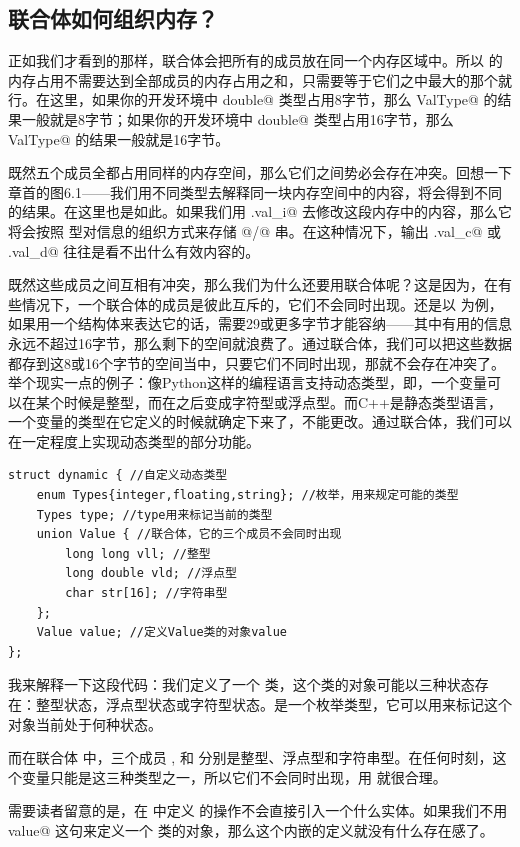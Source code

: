 \subsection*{联合体如何组织内存？}
正如我们才看到的那样，联合体会把所有的成员放在同一个内存区域中。所以 \lstinline@ValType@ 的内存占用不需要达到全部成员的内存占用之和，只需要等于它们之中最大的那个就行。在这里，如果你的开发环境中 \lstinline@long double@ 类型占用8字节，那么 \lstinline@sizeof ValType@ 的结果一般就是8字节；如果你的开发环境中 \lstinline@long double@ 类型占用16字节，那么 \lstinline@sizeof ValType@ 的结果一般就是16字节。\par
既然五个成员全都占用同样的内存空间，那么它们之间势必会存在冲突。回想一下章首的图6.1——我们用不同类型去解释同一块内存空间中的内容，将会得到不同的结果。在这里也是如此。如果我们用 \lstinline@a.val_i@ 去修改这段内存中的内容，那么它将会按照 \lstinline@int@ 型对信息的组织方式来存储 @/@ 串。在这种情况下，输出 \lstinline@a.val_c@ 或 \lstinline@a.val_d@ 往往是看不出什么有效内容的。\par
既然这些成员之间互相有冲突，那么我们为什么还要用联合体呢？这是因为，在有些情况下，一个联合体的成员是彼此互斥的，它们不会同时出现。还是以 \lstinline@ValType@ 为例，如果用一个结构体来表达它的话，需要29或更多字节才能容纳——其中有用的信息永远不超过16字节，那么剩下的空间就浪费了。通过联合体，我们可以把这些数据都存到这8或16个字节的空间当中，只要它们不同时出现，那就不会存在冲突了。
举个现实一点的例子：像Python这样的编程语言支持动态类型，即，一个变量可以在某个时候是整型，而在之后变成字符型或浮点型。而C++是静态类型语言，一个变量的类型在它定义的时候就确定下来了，不能更改。通过联合体，我们可以在一定程度上实现动态类型的部分功能。\par
\begin{lstlisting}
struct dynamic { //自定义动态类型
    enum Types{integer,floating,string}; //枚举，用来规定可能的类型
    Types type; //type用来标记当前的类型
    union Value { //联合体，它的三个成员不会同时出现
        long long vll; //整型
        long double vld; //浮点型
        char str[16]; //字符串型
    };
    Value value; //定义Value类的对象value
};
\end{lstlisting}\par
我来解释一下这段代码：我们定义了一个 \lstinline@dynamic@ 类，这个类的对象可能以三种状态存在：整型状态，浮点型状态或字符型状态。\lstinline@type@ 是一个枚举类型，它可以用来标记这个对象当前处于何种状态。\par
而在联合体 \lstinline@Value@ 中，三个成员 \lstinline@vll@, \lstinline@vld@ 和 \lstinline@str@ 分别是整型、浮点型和字符串型。在任何时刻，这个变量只能是这三种类型之一，所以它们不会同时出现，用 \lstinline@union@ 就很合理。\par
需要读者留意的是，在 \lstinline@dynamic@ 中定义 \lstinline@Value@ 的操作不会直接引入一个什么实体。如果我们不用 \lstinline@Value value@ 这句来定义一个 \lstinline@Value@ 类的对象，那么这个内嵌的定义就没有什么存在感了。\par
